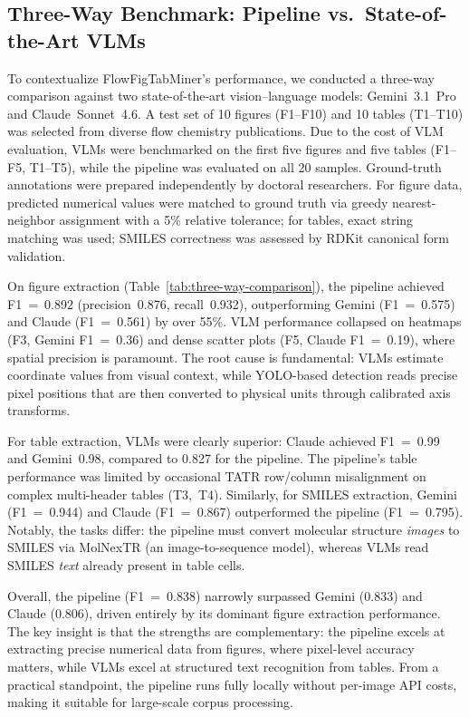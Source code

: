 \documentclass[journal=jcisd8,manuscript=article]{achemso}
\begin{document}
\subsection{Three-Way Benchmark: Pipeline vs.\ State-of-the-Art VLMs}
\label{sec:benchmark}

To contextualize FlowFigTabMiner's performance, we conducted a three-way comparison against two state-of-the-art vision--language models: Gemini~3.1~Pro and Claude~Sonnet~4.6.
A test set of 10 figures (F1--F10) and 10 tables (T1--T10) was selected from diverse flow chemistry publications.
Due to the cost of VLM evaluation, VLMs were benchmarked on the first five figures and five tables (F1--F5, T1--T5), while the pipeline was evaluated on all 20 samples.
Ground-truth annotations were prepared independently by doctoral researchers.
For figure data, predicted numerical values were matched to ground truth via greedy nearest-neighbor assignment with a 5\% relative tolerance; for tables, exact string matching was used; SMILES correctness was assessed by RDKit canonical form validation.

On figure extraction (Table~\ref{tab:three-way-comparison}), the pipeline achieved F1~=~0.892 (precision~0.876, recall~0.932), outperforming Gemini (F1~=~0.575) and Claude (F1~=~0.561) by over 55\%.
VLM performance collapsed on heatmaps (F3, Gemini F1~=~0.36) and dense scatter plots (F5, Claude F1~=~0.19), where spatial precision is paramount.
The root cause is fundamental: VLMs estimate coordinate values from visual context, while YOLO-based detection reads precise pixel positions that are then converted to physical units through calibrated axis transforms.

For table extraction, VLMs were clearly superior: Claude achieved F1~=~0.99 and Gemini~0.98, compared to 0.827 for the pipeline.
The pipeline's table performance was limited by occasional TATR row/column misalignment on complex multi-header tables (T3,~T4).
Similarly, for SMILES extraction, Gemini (F1~=~0.944) and Claude (F1~=~0.867) outperformed the pipeline (F1~=~0.795).
Notably, the tasks differ: the pipeline must convert molecular structure \emph{images} to SMILES via MolNexTR (an image-to-sequence model), whereas VLMs read SMILES \emph{text} already present in table cells.

Overall, the pipeline (F1~=~0.838) narrowly surpassed Gemini (0.833) and Claude (0.806), driven entirely by its dominant figure extraction performance.
The key insight is that the strengths are complementary: the pipeline excels at extracting precise numerical data from figures, where pixel-level accuracy matters, while VLMs excel at structured text recognition from tables.
From a practical standpoint, the pipeline runs fully locally without per-image API costs, making it suitable for large-scale corpus processing.
\end{document}
